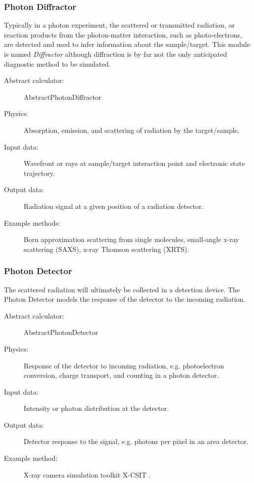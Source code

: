 \documentclass[a4paper]{article}
\begin{document}
\subsubsection{Photon Diffractor}
Typically in a photon experiment, the scattered or transmitted radiation, or reaction products from the photon-matter
interaction, such as photo-electrons, are detected and used to infer information about the sample/target.
This module is named \textit{Diffractor} although diffraction is by far not the only anticipated diagnostic method to be simulated.
\begin{description}
  \item[Abstract calculator:] AbstractPhotonDiffractor
  \item[Physics:] Absorption, emission, and scattering of radiation by the target/sample.
  \item[Input data:] Wavefront or rays at sample/target interaction point and electronic state trajectory.
  \item[Output data:] Radiation signal at a given position of a radiation detector.
  \item[Example methods:] Born approximation scattering from single molecules, small-angle x-ray scattering (SAXS), x-ray Thomson
    scattering (XRTS).
\end{description}
%
\subsubsection{Photon Detector}
The scattered radiation will ultimately  be collected in a detection device. The Photon Detector models the response of the detector to the incoming
radiation.
\begin{description}
  \item[Abstract calculator:] AbstractPhotonDetector
  \item[Physics:] Response of the detector to incoming radiation, e.g. photoelectron conversion, charge transport, and counting in a photon detector.
  \item[Input data:] Intensity or photon distribution at the detector.
  \item[Output data:] Detector response to the signal, e.g. photons per pixel in an area detector.
  \item[Example method:] X-ray camera simulation toolkit X-CSIT \cite{Joy2015}.
\end{description}
%
\end{document}
